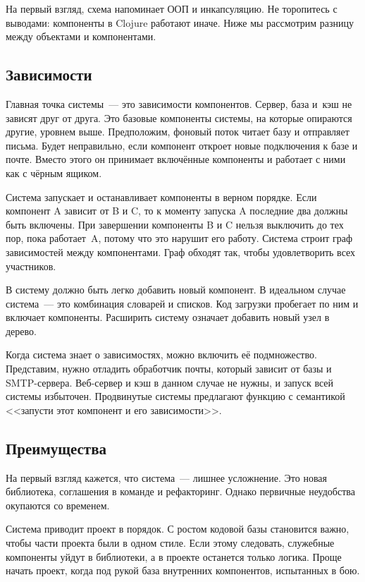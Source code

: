 На первый взгляд, схема напоминает ООП и инкапсуляцию. Не торопитесь с выводами:
компоненты в Clojure работают иначе. Ниже мы рассмотрим разницу между объектами
и компонентами.

\subsection{Зависимости}

Главная точка системы~--- это зависимости компонентов. Сервер, база и~кэш не зависят
друг от друга. Это базовые компоненты системы, на которые опираются другие,
уровнем выше. Предположим, фоновый поток читает базу и отправляет письма. Будет
неправильно, если компонент откроет новые подключения к базе и почте. Вместо
этого он принимает включённые компоненты и работает с ними как с чёрным ящиком.

Система запускает и останавливает компоненты в верном порядке. Если компонент A
зависит от B и C, то к моменту запуска A последние два должны быть включены. При
завершении компоненты B и C нельзя выключить до тех пор, пока работает~A, потому
что это нарушит его работу. Система строит граф зависимостей между
компонентами. Граф обходят так, чтобы удовлетворить всех участников.

В систему должно быть легко добавить новый компонент. В идеальном случае система~---
это комбинация словарей и списков. Код загрузки пробегает по ним и включает
компоненты. Расширить систему означает добавить новый узел в дерево.

Когда система знает о зависимостях, можно включить её подмножество. Представим,
нужно отладить обработчик почты, который зависит от базы и
SMTP-сервера. Веб-сервер и кэш в данном случае не нужны, и запуск всей системы
избыточен. Продвинутые системы предлагают функцию с семантикой <<запусти этот
компонент и его зависимости>>.

\subsection{Преимущества}

На первый взгляд кажется, что система~--- лишнее усложнение. Это новая
библиотека, соглашения в команде и рефакторинг. Однако первичные неудобства
окупаются со временем.

Система приводит проект в порядок. С ростом кодовой базы становится важно, чтобы
части проекта были в одном стиле. Если этому следовать, служебные компоненты
уйдут в библиотеки, а в проекте останется только логика. Проще начать проект,
когда под рукой база внутренних компонентов, испытанных в бою.

